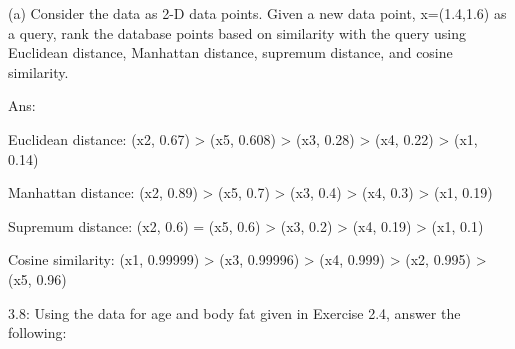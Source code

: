 	\begin{description}
		\item (a) Consider the data as 2-D data points. Given a new data point, x=(1.4,1.6) as a query,
		rank the database points based on similarity with the query using Euclidean distance,
		Manhattan distance, supremum distance, and cosine similarity.

		\vspace{0.5\baselineskip}

		Ans:

		\begin{description}

			\item Euclidean distance: (x2, 0.67) > (x5, 0.608) > (x3, 0.28) > (x4, 0.22) > (x1, 0.14)
			\vspace{0.5\baselineskip}
			\item Manhattan distance: (x2, 0.89) > (x5, 0.7) > (x3, 0.4) > (x4, 0.3) > (x1, 0.19)
			\vspace{0.5\baselineskip}
			\item Supremum distance: (x2, 0.6) = (x5, 0.6) > (x3, 0.2) > (x4, 0.19) > (x1, 0.1)
			\vspace{0.5\baselineskip}
			\item Cosine similarity: (x1, 0.99999) > (x3, 0.99996) > (x4, 0.999) > (x2, 0.995) > (x5, 0.96)
			
		\end{description}

	\end{description}

	\clearpage
	
	3.8: Using the data for age and body fat given in Exercise 2.4, answer the following:

	\vspace{0.5\baselineskip}

